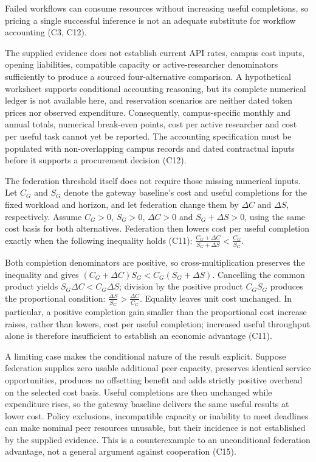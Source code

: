 \documentclass[11pt]{article}
\begin{document}
Failed workflows can consume resources without increasing useful completions, so pricing a single successful inference is not an adequate substitute for workflow accounting (C3, C12).

The supplied evidence does not establish current API rates, campus cost inputs, opening liabilities, compatible capacity or active-researcher denominators sufficiently to produce a sourced four-alternative comparison. A hypothetical worksheet supports conditional accounting reasoning, but its complete numerical ledger is not available here, and reservation scenarios are neither dated token prices nor observed expenditure. Consequently, campus-specific monthly and annual totals, numerical break-even points, cost per active researcher and cost per useful task cannot yet be reported. The accounting specification must be populated with non-overlapping campus records and dated contractual inputs before it supports a procurement decision (C12).

The federation threshold itself does not require those missing numerical inputs. Let $C_G$ and $S_G$ denote the gateway baseline\textquoteright{}s cost and useful completions for the fixed workload and horizon, and let federation change them by $\Delta C$ and $\Delta S$, respectively. Assume $C_G>0$, $S_G>0$, $\Delta C>0$ and $S_G+\Delta S>0$, using the same cost basis for both alternatives. Federation then lowers cost per useful completion exactly when the following inequality holds (C11):
$\frac{C_G+\Delta C}{S_G+\Delta S}<\frac{C_G}{S_G}.$

Both completion denominators are positive, so cross-multiplication preserves the inequality and gives $(C_G+\Delta C)S_G<C_G(S_G+\Delta S)$. Cancelling the common product yields $S_G\Delta C<C_G\Delta S$; division by the positive product $C_GS_G$ produces the proportional condition:
$\frac{\Delta S}{S_G}>\frac{\Delta C}{C_G}.$
Equality leaves unit cost unchanged. In particular, a positive completion gain smaller than the proportional cost increase raises, rather than lowers, cost per useful completion; increased useful throughput alone is therefore insufficient to establish an economic advantage (C11).

A limiting case makes the conditional nature of the result explicit. Suppose federation supplies zero usable additional peer capacity, preserves identical service opportunities, produces no offsetting benefit and adds strictly positive overhead on the selected cost basis. Useful completions are then unchanged while expenditure rises, so the gateway baseline delivers the same useful results at lower cost. Policy exclusions, incompatible capacity or inability to meet deadlines can make nominal peer resources unusable, but their incidence is not established by the supplied evidence. This is a counterexample to an unconditional federation advantage, not a general argument against cooperation (C15).
\end{document}
